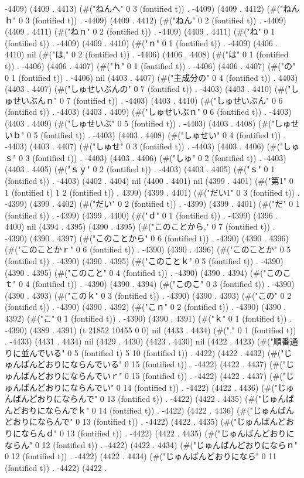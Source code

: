 -4409) (4409 . 4413) (#("ねんへ" 0 3 (fontified t)) . -4409) (4409 . 4412) (#("ねんｈ" 0 3 (fontified t)) . -4409) (4409 . 4412) (#("ねん" 0 2 (fontified t)) . -4409) (4409 . 4411) (#("ねｎ" 0 2 (fontified t)) . -4409) (4409 . 4411) (#("ね" 0 1 (fontified t)) . -4409) (4409 . 4410) (#("ｎ" 0 1 (fontified t)) . -4409) (4406 . 4410) nil (#("は," 0 2 (fontified t)) . -4406) (4406 . 4408) (#("は" 0 1 (fontified t)) . -4406) (4406 . 4407) (#("ｈ" 0 1 (fontified t)) . -4406) (4406 . 4407) (#("の" 0 1 (fontified t)) . -4406) nil (4403 . 4407) (#("主成分の" 0 4 (fontified t)) . 4403) (4403 . 4407) (#("しゅせいぶんの" 0 7 (fontified t)) . -4403) (4403 . 4410) (#("しゅせいぶんｎ" 0 7 (fontified t)) . -4403) (4403 . 4410) (#("しゅせいぶん" 0 6 (fontified t)) . -4403) (4403 . 4409) (#("しゅせいぶｎ" 0 6 (fontified t)) . -4403) (4403 . 4409) (#("しゅせいぶ" 0 5 (fontified t)) . -4403) (4403 . 4408) (#("しゅせいｂ" 0 5 (fontified t)) . -4403) (4403 . 4408) (#("しゅせい" 0 4 (fontified t)) . -4403) (4403 . 4407) (#("しゅせ" 0 3 (fontified t)) . -4403) (4403 . 4406) (#("しゅｓ" 0 3 (fontified t)) . -4403) (4403 . 4406) (#("しゅ" 0 2 (fontified t)) . -4403) (4403 . 4405) (#("ｓｙ" 0 2 (fontified t)) . -4403) (4403 . 4405) (#("ｓ" 0 1 (fontified t)) . -4403) (4402 . 4404) nil (4400 . 4401) nil (4399 . 4401) (#("第1" 0 1 (fontified t) 1 2 (fontified t)) . 4399) (4399 . 4401) (#("だい1" 0 3 (fontified t)) . -4399) (4399 . 4402) (#("だい" 0 2 (fontified t)) . -4399) (4399 . 4401) (#("だ" 0 1 (fontified t)) . -4399) (4399 . 4400) (#("ｄ" 0 1 (fontified t)) . -4399) (4396 . 4400) nil (4394 . 4395) (4390 . 4395) (#("このことから," 0 7 (fontified t)) . -4390) (4390 . 4397) (#("このことから" 0 6 (fontified t)) . -4390) (4390 . 4396) (#("このことかｒ" 0 6 (fontified t)) . -4390) (4390 . 4396) (#("このことか" 0 5 (fontified t)) . -4390) (4390 . 4395) (#("このことｋ" 0 5 (fontified t)) . -4390) (4390 . 4395) (#("このこと" 0 4 (fontified t)) . -4390) (4390 . 4394) (#("このこｔ" 0 4 (fontified t)) . -4390) (4390 . 4394) (#("このこ" 0 3 (fontified t)) . -4390) (4390 . 4393) (#("このｋ" 0 3 (fontified t)) . -4390) (4390 . 4393) (#("この" 0 2 (fontified t)) . -4390) (4390 . 4392) (#("こｎ" 0 2 (fontified t)) . -4390) (4390 . 4392) (#("こ" 0 1 (fontified t)) . -4390) (4390 . 4391) (#("ｋ" 0 1 (fontified t)) . -4390) (4389 . 4391) (t 21852 10455 0 0) nil (4433 . 4434) (#("." 0 1 (fontified t)) . -4433) (4431 . 4434) nil (4429 . 4430) (4423 . 4430) nil (4422 . 4423) (#("順番通りに並んでいる" 0 5 (fontified t) 5 10 (fontified t)) . 4422) (4422 . 4432) (#("じゅんばんどおりにならんでいる" 0 15 (fontified t)) . -4422) (4422 . 4437) (#("じゅんばんどおりにならんでいｒ" 0 15 (fontified t)) . -4422) (4422 . 4437) (#("じゅんばんどおりにならんでい" 0 14 (fontified t)) . -4422) (4422 . 4436) (#("じゅんばんどおりにならんで" 0 13 (fontified t)) . -4422) (4422 . 4435) (#("じゅんばんどおりにならんでｋ" 0 14 (fontified t)) . -4422) (4422 . 4436) (#("じゅんばんどおりにならんで" 0 13 (fontified t)) . -4422) (4422 . 4435) (#("じゅんばんどおりにならんｄ" 0 13 (fontified t)) . -4422) (4422 . 4435) (#("じゅんばんどおりにならん" 0 12 (fontified t)) . -4422) (4422 . 4434) (#("じゅんばんどおりにならｎ" 0 12 (fontified t)) . -4422) (4422 . 4434) (#("じゅんばんどおりになら" 0 11 (fontified t)) . -4422) (4422 . 